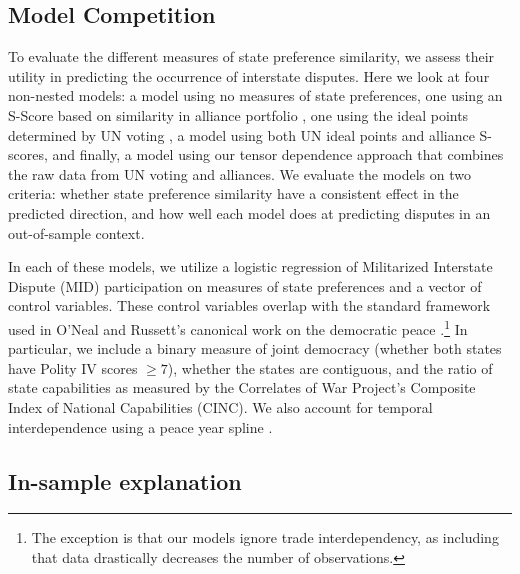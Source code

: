 \documentclass[12pt,pdflatex]{elsarticle}
\begin{document}
\subsection*{Model Competition}

To evaluate the different measures of state preference similarity, we assess their utility in predicting the occurrence of interstate disputes. Here we look at four non-nested models: a model using no measures of state preferences, one using an S-Score based on similarity in alliance portfolio \citep{signorino:ritter:1999}, one using the ideal points determined by UN voting \citep{bailey:etal:2015}, a model using both UN ideal points and alliance S-scores, and finally, a model using our tensor dependence approach that combines the raw data from UN voting and alliances. We evaluate the models on two criteria: whether state preference similarity have a consistent effect in the predicted direction, and how well each model does at predicting disputes in an out-of-sample context.

In each of these models, we utilize a logistic regression of Militarized Interstate Dispute (MID) participation on measures of state preferences and a vector of control variables. These control variables overlap with the standard framework used in O'Neal and Russett's canonical work on the democratic peace \citep{oneal:russett:1997}.\footnote{The exception is that our models ignore trade interdependency, as including that data drastically decreases the number of observations.} In particular, we include a binary measure of joint democracy (whether both states have Polity IV scores $\geq 7$), whether the states are contiguous, and the ratio of state capabilities as measured by the Correlates of War Project's Composite Index of National Capabilities (CINC). We also account for temporal interdependence using a peace year spline \citep{carter:signorino:2010}.

\subsection*{In-sample explanation}
\end{document}
